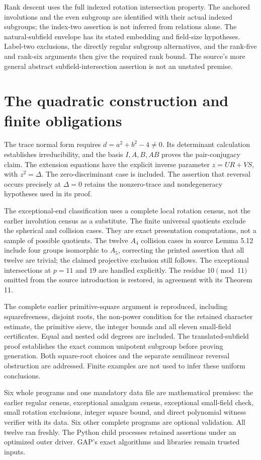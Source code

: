 \documentclass[11pt,a4paper]{article}
\begin{document}
Rank descent uses the full indexed rotation intersection property. The anchored
involutions and the even subgroup are identified with their actual indexed
subgroups; the index-two assertion is not inferred from relations alone.
The natural-subfield envelope has its stated embedding and field-size
hypotheses. Label-two exclusions, the directly regular subgroup alternatives,
and the rank-five and rank-six arguments then give the required rank bound.
The source's more general abstract subfield-intersection assertion is not an
unstated premise.

\newpage
\section*{The quadratic construction and finite obligations}
The trace normal form requires $d=a^2+b^2-4\ne0$. Its determinant calculation
establishes irreducibility, and the basis $I,A,B,AB$ proves the pair-conjugacy
claim. The extension equations have the explicit inverse parameter
$z=UR+VS$, with $z^2=\Delta$. The zero-discriminant case is included.
The assertion that reversal occurs precisely at $\Delta=0$ retains the
nonzero-trace and nondegeneracy hypotheses used in its proof.

The exceptional-end classification uses a complete local rotation census,
not the earlier involution census as a substitute. The finite universal
quotients exclude the spherical and collision cases. They are exact
presentation computations, not a sample of possible quotients. The twelve
$A_4$ collision cases in source Lemma 5.12 include four groups isomorphic to
$A_5$, correcting the printed assertion that all twelve are trivial; the
claimed projective exclusion still follows. The exceptional intersections
at $p=11$ and $19$ are handled explicitly. The residue $10\pmod {11}$ omitted
from the source introduction is restored, in agreement with its Theorem 11.

The complete earlier primitive-square argument is reproduced, including
squarefreeness, disjoint roots, the non-power condition for the retained
character estimate, the primitive sieve, the integer bounds and all eleven
small-field certificates. Equal and nested odd degrees are included.
The translated-subfield proof establishes the exact common unipotent subgroup
before proving generation. Both square-root choices and the separate
semilinear reversal obstruction are addressed. Finite examples are not used
to infer these uniform conclusions.

Six whole programs and one mandatory data file are mathematical premises:
the earlier regular census, exceptional amalgam census, exceptional small-field
check, small rotation exclusions, integer square bound, and direct polynomial
witness verifier with its data. Six other complete programs are optional
validation. All twelve ran freshly. The Python child processes retained
assertions under an optimized outer driver. GAP's exact algorithms and
libraries remain trusted inputs.
\end{document}
